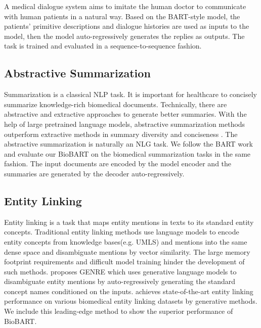 \documentclass[11pt]{article}
\begin{document}
A medical dialogue system aims to imitate the human doctor to communicate with human patients in a natural way. Based on the BART-style model, the patients' primitive descriptions and dialogue histories are used as inputs to the model, then the model auto-regressively generates the replies as outputs. The task is trained and evaluated in a sequence-to-sequence fashion. 

\subsection{Abstractive Summarization}

Summarization is a classical NLP task. It is important for healthcare to concisely summarize knowledge-rich biomedical
documents. Technically, there are abstractive and extractive approaches to generate better summaries. With the help of large pretrained language models, abstractive summarization methods outperform extractive methods in summary diversity and conciseness \cite{zhang2019pegasus,gsum}. The abstractive summarization is naturally an NLG task. We follow the BART \cite{BART} work and evaluate our BioBART on the biomedical summarization tasks in the same fashion. The input documents are encoded by the model encoder and the summaries are generated by the decoder auto-regressively. 

\subsection{Entity Linking}

Entity linking is a task that maps entity mentions in texts to its standard entity concepts. Traditional entity linking methods use language models to encode entity concepts from knowledge bases(e.g. UMLS) and mentions into the same dense space and disambiguate mentions by vector similarity. The large memory footprint requirements and difficult model training hinder the development of such methods. \citet{GENRE} proposes GENRE which uses generative language models to disambiguate entity mentions by auto-regressively generating the standard concept names conditioned on the inputs. \cite{oursnaaclshort} achieves state-of-the-art entity linking performance on various biomedical entity linking datasets by generative methods. We include this leading-edge method to show the superior performance of BioBART.
\end{document}
